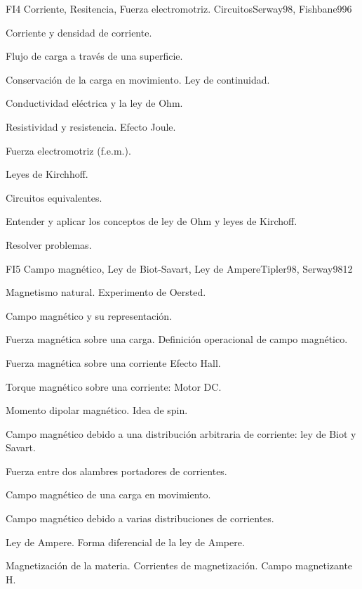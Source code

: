 \begin{syllabus}
\begin{unit}{FI4 Corriente, Resitencia, Fuerza electromotriz. Circuitos}{Serway98, Fishbane99}{6}
   \begin{topics}
         \item  Corriente y densidad de corriente.
	 \item  Flujo de carga a través de una superficie.
         \item  Conservación de la carga en movimiento. Ley de continuidad.
	 \item  Conductividad eléctrica y la ley de Ohm.
         \item  Resistividad y resistencia.  Efecto Joule.
	 \item  Fuerza electromotriz (f.e.m.).
         \item  Leyes de Kirchhoff.
	 \item  Circuitos equivalentes.
   \end{topics}

   \begin{unitgoals}
         \item  Entender y aplicar los conceptos de ley de Ohm y leyes de Kirchoff.
         \item  Resolver problemas.
   \end{unitgoals}
\end{unit}

\begin{unit}{FI5 Campo magnético, Ley de Biot-Savart, Ley de Ampere}{Tipler98, Serway98}{12}
   \begin{topics}
         \item  Magnetismo natural. Experimento de Oersted.
	 \item  Campo magnético y su representación.
         \item  Fuerza magnética sobre una carga. Definición operacional de campo magnético.
	 \item  Fuerza magnética sobre una corriente  Efecto Hall.
         \item  Torque magnético sobre una corriente: Motor DC.
	 \item  Momento dipolar magnético.  Idea de spin.
         \item  Campo magnético debido a una distribución arbitraria de corriente:  ley de Biot y Savart.
	 \item  Fuerza entre dos alambres portadores de corrientes.
         \item  Campo magnético de una carga en movimiento.
	 \item  Campo magnético debido a varias distribuciones de corrientes.
         \item  Ley de Ampere.  Forma diferencial de la ley de Ampere.
	 \item  Magnetización de la materia. Corrientes de magnetización. Campo magnetizante H.
   \end{topics}


\end{unit}
\end{syllabus}
